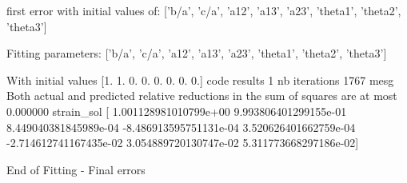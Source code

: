 \documentclass[letterpaper,10pt,english]{sphinxmanual}
\begin{document}
\begin{sphinxalltt}
\sphinxstylestrong{***********************}
first error with initial values of: {[}'b/a', 'c/a', 'a12', 'a13', 'a23', 'theta1', 'theta2', 'theta3'{]}

\sphinxstylestrong{***********************}



\sphinxstylestrong{***********************}
Fitting parameters:   {[}'b/a', 'c/a', 'a12', 'a13', 'a23', 'theta1', 'theta2', 'theta3'{]}

\sphinxstylestrong{***********************}

With initial values {[}1. 1. 0. 0. 0. 0. 0. 0.{]}
code results 1
nb iterations 1767
mesg Both actual and predicted relative reductions in the sum of squares
  are at most 0.000000
strain\_sol {[} 1.001128981010799e+00  9.993806401299155e-01  8.449040381845989e-04
 -8.486913595751131e-04  3.520626401662759e-04 -2.714612741167435e-02
  3.054889720130747e-02  5.311773668297186e-02{]}


 \sphinxstylestrong{**********}  End of Fitting  -  Final errors  \sphinxstylestrong{**************}



\end{sphinxalltt}
\end{document}
